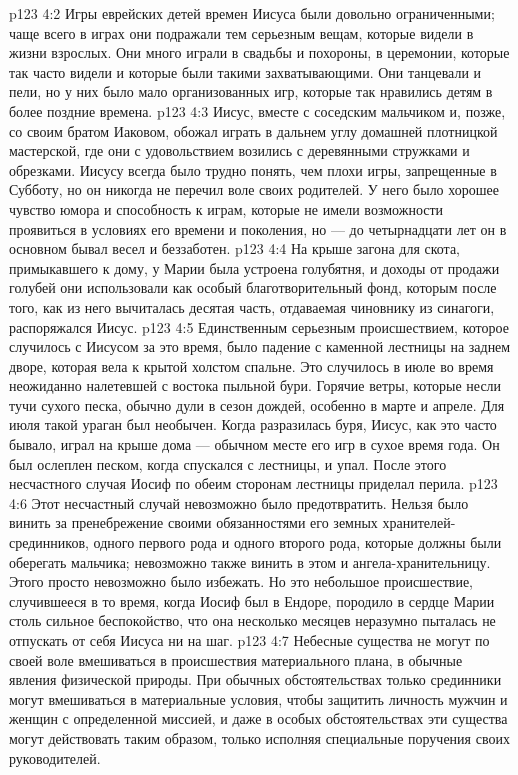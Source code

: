 \vs p123 4:2 Игры еврейских детей времен Иисуса были довольно ограниченными; чаще всего в играх они подражали тем серьезным вещам, которые видели в жизни взрослых. Они много играли в свадьбы и похороны, в церемонии, которые так часто видели и которые были такими захватывающими. Они танцевали и пели, но у них было мало организованных игр, которые так нравились детям в более поздние времена.
\vs p123 4:3 Иисус, вместе с соседским мальчиком и, позже, со своим братом Иаковом, обожал играть в дальнем углу домашней плотницкой мастерской, где они с удовольствием возились с деревянными стружками и обрезками. Иисусу всегда было трудно понять, чем плохи игры, запрещенные в Субботу, но он никогда не перечил воле своих родителей. У него было хорошее чувство юмора и способность к играм, которые не имели возможности проявиться в условиях его времени и поколения, но --- до четырнадцати лет он в основном бывал весел и беззаботен.
\vs p123 4:4 На крыше загона для скота, примыкавшего к дому, у Марии была устроена голубятня, и доходы от продажи голубей они использовали как особый благотворительный фонд, которым после того, как из него вычиталась десятая часть, отдаваемая чиновнику из синагоги, распоряжался Иисус.
\vs p123 4:5 \pc Единственным серьезным происшествием, которое случилось с Иисусом за это время, было падение с каменной лестницы на заднем дворе, которая вела к крытой холстом спальне. Это случилось в июле во время неожиданно налетевшей с востока пыльной бури. Горячие ветры, которые несли тучи сухого песка, обычно дули в сезон дождей, особенно в марте и апреле. Для июля такой ураган был необычен. Когда разразилась буря, Иисус, как это часто бывало, играл на крыше дома --- обычном месте его игр в сухое время года. Он был ослеплен песком, когда спускался с лестницы, и упал. После этого несчастного случая Иосиф по обеим сторонам лестницы приделал перила.
\vs p123 4:6 Этот несчастный случай невозможно было предотвратить. Нельзя было винить за пренебрежение своими обязанностями его земных хранителей\hyp{}срединников, одного первого рода и одного второго рода, которые должны были оберегать мальчика; невозможно также винить в этом и ангела\hyp{}хранительницу. Этого просто невозможно было избежать. Но это небольшое происшествие, случившееся в то время, когда Иосиф был в Ендоре, породило в сердце Марии столь сильное беспокойство, что она несколько месяцев неразумно пыталась не отпускать от себя Иисуса ни на шаг.
\vs p123 4:7 Небесные существа не могут по своей воле вмешиваться в происшествия материального плана, в обычные явления физической природы. При обычных обстоятельствах только срединники могут вмешиваться в материальные условия, чтобы защитить личность мужчин и женщин с определенной миссией, и даже в особых обстоятельствах эти существа могут действовать таким образом, только исполняя специальные поручения своих руководителей.
